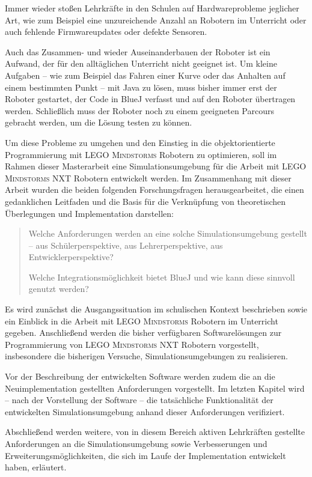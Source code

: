 \documentclass[paper=a4, DIV=calc, BCOR=12mm, twoside=on, onecolumn=on, open = right, titlepage =on, parskip =half-, headsepline = on, footsepline = off, chapterprefix = off, appendixprefix = on, fontsize = 12pt, numbers = noenddot, abstract = on]{scrbook}
\begin{document}
Immer wieder stoßen Lehrkräfte in den Schulen auf Hardwareprobleme jeglicher Art, wie zum Beispiel eine unzureichende Anzahl an Robotern im Unterricht oder auch fehlende Firmwareupdates oder defekte Sensoren.

Auch das Zusammen- und wieder Auseinanderbauen der Roboter ist ein Aufwand, der für den alltäglichen Unterricht nicht geeignet ist. Um kleine Aufgaben -- wie zum Beispiel das Fahren einer Kurve oder das Anhalten auf einem bestimmten Punkt -- mit Java zu lösen, muss bisher immer erst der Roboter gestartet, der Code in BlueJ verfasst und auf den Roboter übertragen werden. Schließlich muss der Roboter noch zu einem geeigneten Parcours gebracht werden, um die Lösung testen zu können.

Um diese Probleme zu umgehen und den Einstieg in die objektorientierte Programmierung mit \textsc{LEGO Mindstorms} Robotern zu optimieren, soll im Rahmen dieser Masterarbeit eine Simulationsumgebung für die Arbeit mit \textsc{LEGO Mindstorms} NXT Robotern entwickelt werden. Im Zusammenhang mit dieser Arbeit wurden die beiden folgenden Forschungsfragen herausgearbeitet, die einen gedanklichen Leitfaden und die Basis für die Verknüpfung von theoretischen Überlegungen und Implementation darstellen:
\begin{quote}
Welche Anforderungen werden an eine solche Simulationsumgebung gestellt -- aus Schülerperspektive, aus Lehrerperspektive, aus Entwicklerperspektive?

Welche Integrationsmöglichkeit bietet BlueJ und wie kann diese sinnvoll genutzt werden?
\end{quote}

Es wird zunächst die Ausgangssituation im schulischen Kontext beschrieben sowie ein Einblick in die Arbeit mit \textsc{LEGO Mindstorms} Robotern im Unterricht gegeben. Anschließend werden die bisher verfügbaren Softwarelösungen zur Programmierung von \textsc{LEGO Mindstorms} NXT Robotern vorgestellt, insbesondere die bisherigen Versuche, Simulationsumgebungen zu realisieren.

Vor der Beschreibung der entwickelten Software werden zudem die an die Neuimplementation gestellten Anforderungen vorgestellt. Im letzten Kapitel wird -- nach der Vorstellung der Software -- die tatsächliche Funktionalität der entwickelten Simulationsumgebung anhand dieser Anforderungen verifiziert.

Abschließend werden weitere, von in diesem Bereich aktiven Lehrkräften gestellte Anforderungen an die Simulationsumgebung sowie Verbesserungen und Erweiterungsmöglichkeiten, die sich im Laufe der Implementation entwickelt haben, erläutert.
\newpage
\par\singlespacing
\end{document}
